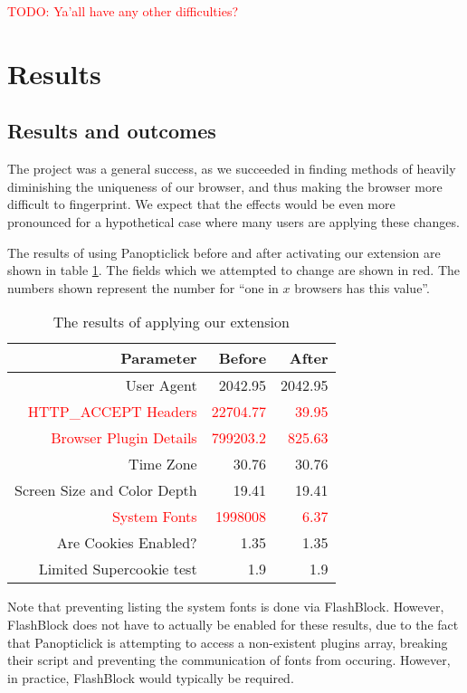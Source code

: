 \documentclass[12pt,a4paper]{article}
\begin{document}
\textcolor{red}{TODO: Ya'all have any other difficulties?}

\section{Results}
\subsection{Results and outcomes}
\label{subsec:results}
The project was a general success, as we succeeded in finding methods of heavily diminishing the uniqueness of our browser, and thus making the browser more difficult to fingerprint. We expect that the effects would be even more pronounced for a hypothetical case where many users are applying these changes.

The results of using Panopticlick before and after activating our extension are shown in table \ref{tab:resultTable}. The fields which we attempted to change are shown in red. The numbers shown represent the number for ``one in $x$ browsers has this value''.

\begin{table}[h]
	\centering
	\begin{tabular}{|r|r|r|}
		\hline
		\textbf{Parameter} & \textbf{Before} & \textbf{After} \\
		\hline
		User Agent & 2042.95 & 2042.95 \\
		\textcolor{red}{HTTP\_ACCEPT Headers} & \textcolor{red}{22704.77} & \textcolor{red}{39.95} \\
		\textcolor{red}{Browser Plugin Details} & \textcolor{red}{799203.2} & \textcolor{red}{825.63} \\
		Time Zone & 30.76 & 30.76 \\
		Screen Size and Color Depth & 19.41 & 19.41 \\
		\textcolor{red}{System Fonts} & \textcolor{red}{1998008} & \textcolor{red}{6.37} \\
		Are Cookies Enabled? & 1.35 & 1.35 \\
		Limited Supercookie test & 1.9 & 1.9 \\
		\hline
	\end{tabular}
	\caption{The results of applying our extension}
 	\label{tab:resultTable}
\end{table}

Note that preventing listing the system fonts is done via FlashBlock. However, FlashBlock does not have to actually be enabled for these results, due to the fact that Panopticlick is attempting to access a non-existent plugins array, breaking their script and preventing the communication of fonts from occuring. However, in practice, FlashBlock would typically be required.
\end{document}
